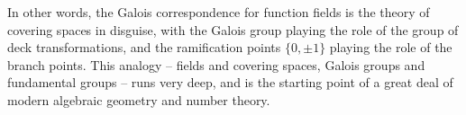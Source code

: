 In other words, the Galois correspondence for function fields is the theory of covering spaces in disguise, with the Galois group playing the role of the group of deck transformations, and the ramification points $\{0,\pm1\}$ playing the role of the branch points. This analogy -- fields and covering spaces, Galois groups and fundamental groups -- runs very deep, and is the starting point of a great deal of modern algebraic geometry and number theory.

